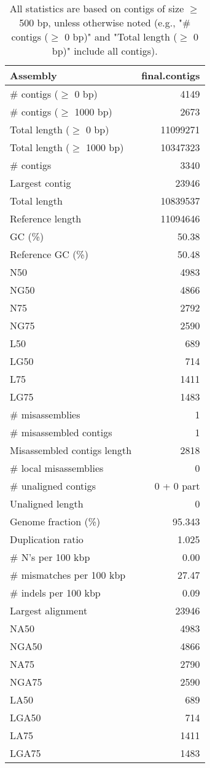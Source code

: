 \documentclass[12pt,a4paper]{article}
\begin{document}
\begin{table}[ht]
\begin{center}
\caption{All statistics are based on contigs of size $\geq$ 500 bp, unless otherwise noted (e.g., "\# contigs ($\geq$ 0 bp)" and "Total length ($\geq$ 0 bp)" include all contigs).}
\begin{tabular}{|l*{1}{|r}|}
\hline
Assembly & final.contigs \\ \hline
\# contigs ($\geq$ 0 bp) & 4149 \\ \hline
\# contigs ($\geq$ 1000 bp) & 2673 \\ \hline
Total length ($\geq$ 0 bp) & 11099271 \\ \hline
Total length ($\geq$ 1000 bp) & 10347323 \\ \hline
\# contigs & 3340 \\ \hline
Largest contig & 23946 \\ \hline
Total length & 10839537 \\ \hline
Reference length & 11094646 \\ \hline
GC (\%) & 50.38 \\ \hline
Reference GC (\%) & 50.48 \\ \hline
N50 & 4983 \\ \hline
NG50 & 4866 \\ \hline
N75 & 2792 \\ \hline
NG75 & 2590 \\ \hline
L50 & 689 \\ \hline
LG50 & 714 \\ \hline
L75 & 1411 \\ \hline
LG75 & 1483 \\ \hline
\# misassemblies & 1 \\ \hline
\# misassembled contigs & 1 \\ \hline
Misassembled contigs length & 2818 \\ \hline
\# local misassemblies & 0 \\ \hline
\# unaligned contigs & 0 + 0 part \\ \hline
Unaligned length & 0 \\ \hline
Genome fraction (\%) & 95.343 \\ \hline
Duplication ratio & 1.025 \\ \hline
\# N's per 100 kbp & 0.00 \\ \hline
\# mismatches per 100 kbp & 27.47 \\ \hline
\# indels per 100 kbp & 0.09 \\ \hline
Largest alignment & 23946 \\ \hline
NA50 & 4983 \\ \hline
NGA50 & 4866 \\ \hline
NA75 & 2790 \\ \hline
NGA75 & 2590 \\ \hline
LA50 & 689 \\ \hline
LGA50 & 714 \\ \hline
LA75 & 1411 \\ \hline
LGA75 & 1483 \\ \hline
\end{tabular}
\end{center}
\end{table}
\end{document}
